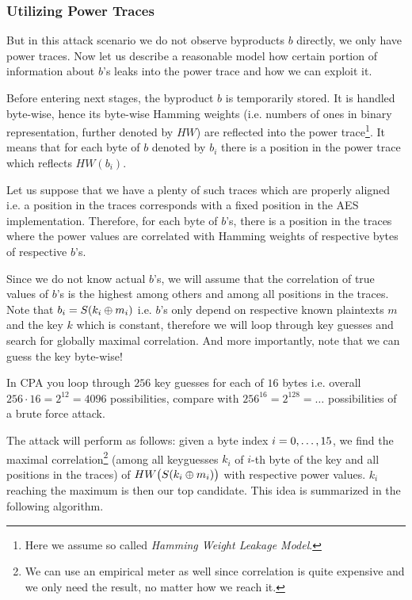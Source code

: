 \subsubsection{Utilizing Power Traces}
	
	But in this attack scenario we do not observe byproducts $b$ directly, we only have power traces. Now let us describe a reasonable model how certain portion of information about $b$'s leaks into the power trace and how we can exploit it.
	
	Before entering next stages, the byproduct $b$ is temporarily stored. It is handled byte-wise, hence its byte-wise Hamming weights (i.e. numbers of ones in binary representation, further denoted by $HW$) are reflected into the power trace\footnote{Here we assume so called {\em Hamming Weight Leakage Model}.}. It means that for each byte of $b$ denoted by $b_i$ there is a position in the power trace which reflects $HW(b_i)$.
	
	Let us suppose that we have a plenty of such traces which are properly aligned i.e. a position in the traces corresponds with a fixed position in the AES implementation. Therefore, for each byte of $b$'s, there is a position in the traces where the power values are correlated with Hamming weights of respective bytes of respective $b$'s.
	
	Since we do not know actual $b$'s, we will assume that the correlation of true values of $b$'s is the highest among others and among all positions in the traces. Note that $b_i = S(k_i\oplus m_i)$ i.e. $b$'s only depend on respective known plaintexts $m$ and the key $k$ which is constant, therefore we will loop through key guesses and search for globally maximal correlation. And more importantly, note that we can guess the key byte-wise!
	
	\begin{note}
	\label{note:brutevssca}
		In CPA you loop through $256$ key guesses for each of $16$ bytes i.e. overall $256\cdot 16 = 2^{12} = 4096$ possibilities, compare with $256^{16} = 2^{128} = \ldots$ possibilities of a brute force attack.
	\end{note}
	
	The attack will perform as follows: given a byte index $i=0 , \ldots , 15$, we find the maximal correlation\footnote{We can use an empirical meter as well since correlation is quite expensive and we only need the result, no matter how we reach it.} (among all keyguesses $k_i$ of $i$-th byte of the key and all positions in the traces) of $HW\bigl(S(k_i\oplus m_i)\bigr)$ with respective power values. $k_i$ reaching the maximum is then our top candidate. This idea is summarized in the following algorithm.
	
